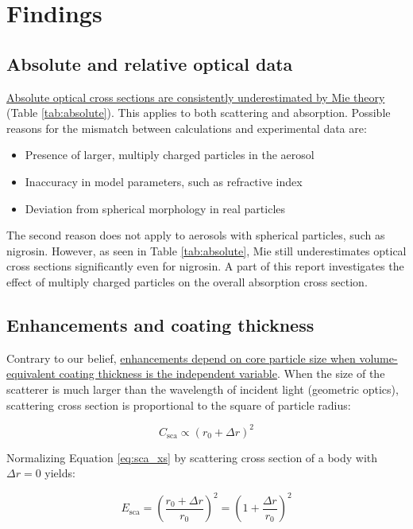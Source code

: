 \documentclass[12pt]{article}
\begin{document}
\section*{Findings}
\subsection*{Absolute and relative optical data}

\ul{Absolute optical cross sections are consistently underestimated by Mie theory} (Table \ref{tab:absolute}). This applies to both scattering and absorption. Possible reasons for the mismatch between calculations and experimental data are:

\begin{itemize}
    \item Presence of larger, multiply charged particles in the aerosol
    \item Inaccuracy in model parameters, such as refractive index
    \item Deviation from spherical morphology in real particles
\end{itemize}

The second reason does not apply to aerosols with spherical particles, such as nigrosin. However, as seen in Table \ref{tab:absolute}, Mie still underestimates optical cross sections significantly even for nigrosin. A part of this report investigates the effect of multiply charged particles on the overall absorption cross section.

\subsection*{Enhancements and coating thickness}

Contrary to our belief, \ul{enhancements depend on core particle size when volume-equivalent coating thickness is the independent variable}. When the size of the scatterer is much larger than the wavelength of incident light (geometric optics), scattering cross section is proportional to the square of particle radius:

\begin{equation}
    C_{\mathrm{sca}}\propto \left(r_0+\Delta r\right)^2
    \label{eq:sca_xs}
\end{equation}

Normalizing Equation \ref{eq:sca_xs} by scattering cross section of a body with $\Delta r=0$ yields:

\begin{equation}
    E_{\mathrm{sca}}=\left(\frac{r_0+\Delta r}{r_0}\right)^2=\left(1+\frac{\Delta r}{r_0}\right)^2
    \label{eq:sca_enh}
\end{equation}
\end{document}
